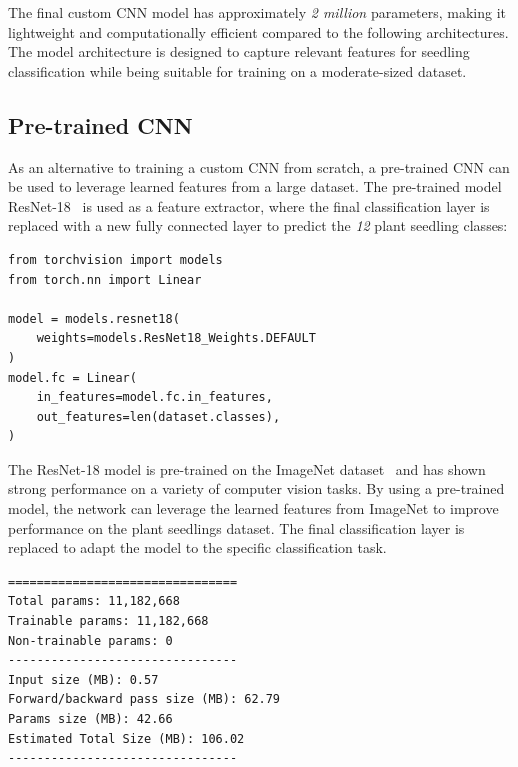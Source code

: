 The final custom CNN model has approximately \textit{2 million} parameters, making it lightweight and computationally efficient compared to the following architectures. The model architecture is designed to capture relevant features for seedling classification while being suitable for training on a moderate-sized dataset.

\subsection{Pre-trained CNN}

As an alternative to training a custom CNN from scratch, a pre-trained CNN can be used to leverage learned features from a large dataset. The pre-trained model ResNet-18~\cite{DBLP:journals/corr/HeZRS15} is used as a feature extractor, where the final classification layer is replaced with a new fully connected layer to predict the \textit{12} plant seedling classes:

\begin{minipage}{0.9\linewidth}\begin{lstlisting}[caption={Replacing the final classification layer of a pre-trained ResNet-18 model.},label={lst:pre-trained-cnn}]
from torchvision import models
from torch.nn import Linear

model = models.resnet18(
    weights=models.ResNet18_Weights.DEFAULT
)
model.fc = Linear(
    in_features=model.fc.in_features,
    out_features=len(dataset.classes),
)
\end{lstlisting}\end{minipage}

The ResNet-18 model is pre-trained on the ImageNet dataset~\cite{5206848ImageNet} and has shown strong performance on a variety of computer vision tasks. By using a pre-trained model, the network can leverage the learned features from ImageNet to improve performance on the plant seedlings dataset. The final classification layer is replaced to adapt the model to the specific classification task.

\begin{minipage}{0.9\linewidth}\begin{lstlisting}[language={},caption={Pre-trained CNN model summary.},label={lst:pre-trained-cnn-summary}]
================================
Total params: 11,182,668
Trainable params: 11,182,668
Non-trainable params: 0
--------------------------------
Input size (MB): 0.57
Forward/backward pass size (MB): 62.79
Params size (MB): 42.66
Estimated Total Size (MB): 106.02
--------------------------------
\end{lstlisting}\end{minipage}

